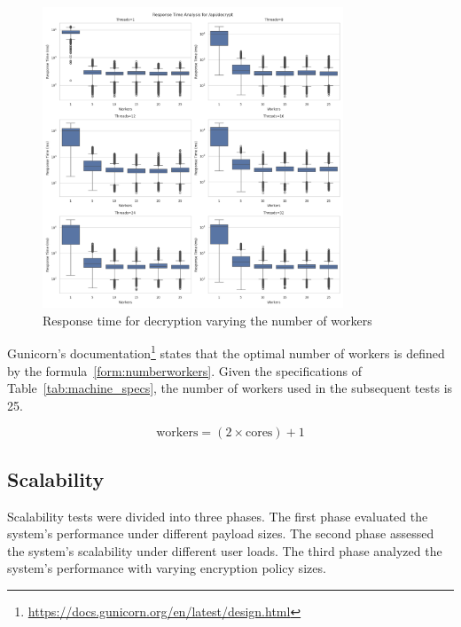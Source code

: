 \documentclass[cic,tc,english]{iiufrgs}
\begin{document}
            \begin{figure}
                \centering
                \includegraphics[width=0.8\textwidth]{images/phase1/api_decrypt/response_time_threads_summary.png}
                \caption{Response time for decryption varying the number of workers}
                \label{fig:decrypt_response_time_threads}
            \end{figure}


            Gunicorn's documentation\footnote{\url{https://docs.gunicorn.org/en/latest/design.html}} states that the optimal number of workers is defined by the formula~\ref{form:numberworkers}. Given the specifications of Table~\ref{tab:machine_specs}, the number of workers used in the subsequent tests is 25.

            \begin{equation}
                \label{form:numberworkers}
                \text{workers} = (2 \times \text{cores}) + 1
            \end{equation}


        \subsection{Scalability}
            \label{sec:encryptiontime}
            Scalability tests were divided into three phases. The first phase evaluated the system's performance under different payload sizes. The second phase assessed the system's scalability under different user loads. The third phase analyzed the system's performance with varying encryption policy sizes.
\end{document}
